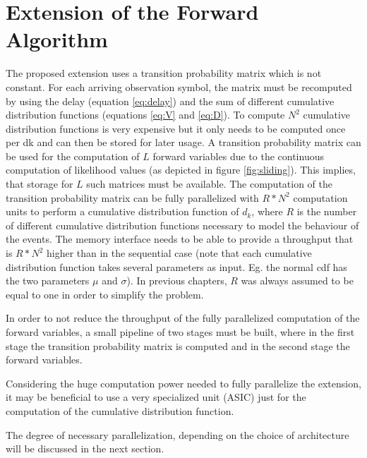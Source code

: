 \documentclass[mscthesis]{usiinfthesis}
\begin{document}
\section{Extension of the Forward Algorithm}
\label{ch:analysis_extension}

The proposed extension uses a transition probability matrix which is not
constant. For each arriving observation symbol, the matrix must be recomputed
by using the delay (equation \ref{eq:delay}) and the sum of different
cumulative distribution functions (equations \ref{eq:V} and \ref{eq:D}). To
compute $N^2$ cumulative distribution functions is very expensive but it only
needs to be computed once per dk and can then be stored for later usage.
A transition probability matrix can be used for the computation of $L$ forward
variables due to the continuous computation of likelihood values (as depicted
in figure \ref{fig:sliding}). This implies, that storage for $L$ such matrices
must be available. The computation of the transition probability matrix can be
fully parallelized with $R*N^2$ computation units to perform a cumulative
distribution function of $d_k$, where $R$ is the number of different cumulative
distribution functions necessary to model the behaviour of the events. The
memory interface needs to be able to provide a throughput that is $R*N^2$
higher than in the sequential case (note that each cumulative distribution
function takes several parameters as input. Eg. the normal cdf has the two
parameters $\mu$ and $\sigma$). In previous chapters, $R$ was always assumed to
be equal to one in order to simplify the problem.

In order to not reduce the throughput of the fully parallelized computation of
the forward variables, a small pipeline of two stages must be built, where in
the first stage the transition probability matrix is computed and in the second
stage the forward variables.

Considering the huge computation power needed to fully parallelize the
extension, it may be beneficial to use a very specialized unit (ASIC) just for
the computation of the cumulative distribution function.

The degree of necessary parallelization, depending on the choice of
architecture will be discussed in the next section.

\end{document}
